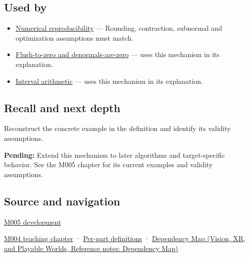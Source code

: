 \subsection{Used by}\label{appendix-f11d1a521253-used-by}

\hypertarget{appendix-f11d1a521253-used-by}{}

\begin{itemize}
\item
  \hyperref[appendix-5f1a2c3f97ff]{Numerical reproducibility} --- Rounding, contraction, subnormal and optimization assumptions must match.
\item
  \hyperref[appendix-e979eb012782]{Flush-to-zero and denormals-are-zero} --- uses this mechanism in its explanation.
\item
  \hyperref[appendix-1823a14330cb]{Interval arithmetic} --- uses this mechanism in its explanation.
\end{itemize}

\subsection{Recall and next depth}\label{appendix-f11d1a521253-recall-and-next-depth}

\hypertarget{appendix-f11d1a521253-recall-and-next-depth}{}

Reconstruct the concrete example in the definition and identify its validity assumptions.

\textbf{Pending:} Extend this mechanism to later algorithms and target-specific behavior. See the M005 chapter for its current examples and validity assumptions.

\subsection{Source and navigation}\label{appendix-f11d1a521253-source-and-navigation}

\hypertarget{appendix-f11d1a521253-source-and-navigation}{}

\hyperref[01-foundations-i-ch001-when-arithmetic-meets-uncertainty]{M005 development}

\hyperref[01-foundations-i-ch001-a-stretching-ruler-for-real-valued-quantities]{M004 teaching chapter} · \hyperref[appendix-fd090d982a15-m004---parts-61-76]{Per-part definitions} · \href{../07-Vision-XR-and-Playable-Worlds/main.pdf\#nameddest=appendix-4ad47bdd269a}{Dependency Map (Vision, XR, and Playable Worlds, Reference notes: Dependency Map)}
